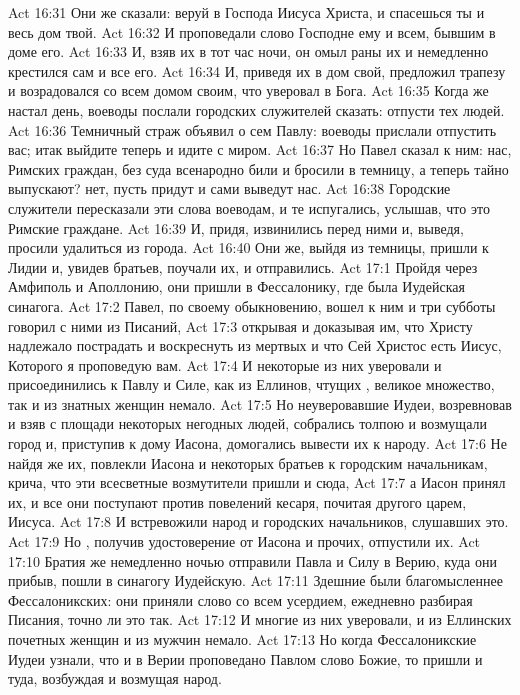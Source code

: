 \vs Act 16:31 Они же сказали: веруй в Господа Иисуса Христа, и спасешься ты и весь дом твой.
\vs Act 16:32 И проповедали слово Господне ему и всем, бывшим в доме его.
\vs Act 16:33 И, взяв их в тот час ночи, он омыл раны их и немедленно крестился сам и все  его.
\vs Act 16:34 И, приведя их в дом свой, предложил трапезу и возрадовался со всем домом своим, что уверовал в Бога.
\rsbpar\vs Act 16:35 Когда же настал день, воеводы послали городских служителей сказать: отпусти тех людей.
\vs Act 16:36 Темничный страж объявил о сем Павлу: воеводы прислали отпустить вас; итак выйдите теперь и идите с миром.
\vs Act 16:37 Но Павел сказал к ним: нас, Римских граждан, без суда всенародно били и бросили в темницу, а теперь тайно выпускают? нет, пусть придут и сами выведут нас.
\vs Act 16:38 Городские служители пересказали эти слова воеводам, и те испугались, услышав, что это Римские граждане.
\vs Act 16:39 И, придя, извинились перед ними и, выведя, просили удалиться из города.
\vs Act 16:40 Они же, выйдя из темницы, пришли к Лидии и, увидев братьев, поучали их, и отправились.
\vs Act 17:1 Пройдя через Амфиполь и Аполлонию, они пришли в Фессалонику, где была Иудейская синагога.
\vs Act 17:2 Павел, по своему обыкновению, вошел к ним и три субботы говорил с ними из Писаний,
\vs Act 17:3 открывая и доказывая им, что Христу надлежало пострадать и воскреснуть из мертвых и что Сей Христос есть Иисус, Которого я проповедую вам.
\vs Act 17:4 И некоторые из них уверовали и присоединились к Павлу и Силе, как из Еллинов, чтущих , великое множество, так и из знатных женщин немало.
\vs Act 17:5 Но неуверовавшие Иудеи, возревновав и взяв с площади некоторых негодных людей, собрались толпою и возмущали город и, приступив к дому Иасона, домогались вывести их к народу.
\vs Act 17:6 Не найдя же их, повлекли Иасона и некоторых братьев к городским начальникам, крича, что эти всесветные возмутители пришли и сюда,
\vs Act 17:7 а Иасон принял их, и все они поступают против повелений кесаря, почитая другого царем, Иисуса.
\vs Act 17:8 И встревожили народ и городских начальников, слушавших это.
\vs Act 17:9 Но , получив удостоверение от Иасона и прочих, отпустили их.
\rsbpar\vs Act 17:10 Братия же немедленно ночью отправили Павла и Силу в Верию, куда они прибыв, пошли в синагогу Иудейскую.
\vs Act 17:11 Здешние были благомысленнее Фессалоникских: они приняли слово со всем усердием, ежедневно разбирая Писания, точно ли это так.
\vs Act 17:12 И многие из них уверовали, и из Еллинских почетных женщин и из мужчин немало.
\vs Act 17:13 Но когда Фессалоникские Иудеи узнали, что и в Верии проповедано Павлом слово Божие, то пришли и туда, возбуждая и возмущая народ.
